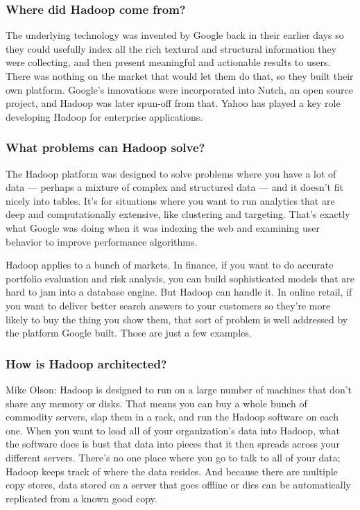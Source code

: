 \documentclass{beamer}
\begin{document}
\begin{frame}
\frametitle{Where did Hadoop come from?}

The underlying technology was invented by Google back in their earlier days so they could usefully index all the rich textural and structural information they were collecting, and then present meaningful and actionable results to users. There was nothing on the market that would let them do that, so they built their own platform. Google’s innovations were incorporated into Nutch, an open source project, and Hadoop was later spun-off from that. Yahoo has played a key role developing Hadoop for enterprise applications.


\end{frame}
\begin{frame}
\frametitle{What problems can Hadoop solve?}

The Hadoop platform was designed to solve problems where you have a lot of data — perhaps a mixture of complex and structured data — and it doesn’t fit nicely into tables. It’s for situations where you want to run analytics that are deep and computationally extensive, like clustering and targeting. That’s exactly what Google was doing when it was indexing the web and examining user behavior to improve performance algorithms.

Hadoop applies to a bunch of markets. In finance, if you want to do accurate portfolio evaluation and risk analysis, you can build sophisticated models that are hard to jam into a database engine. But Hadoop can handle it. In online retail, if you want to deliver better search answers to your customers so they’re more likely to buy the thing you show them, that sort of problem is well addressed by the platform Google built. Those are just a few examples.
\end{frame}
\begin{frame}
\frametitle{How is Hadoop architected?}

Mike Olson: Hadoop is designed to run on a large number of machines that don’t share any memory or disks. That means you can buy a whole bunch of commodity servers, slap them in a rack, and run the Hadoop software on each one. When you want to load all of your organization’s data into Hadoop, what the software does is bust that data into pieces that it then spreads across your different servers. There’s no one place where you go to talk to all of your data; Hadoop keeps track of where the data resides. And because there are multiple copy stores, data stored on a server that goes offline or dies can be automatically replicated from a known good copy.

\end{frame}
\end{document}
